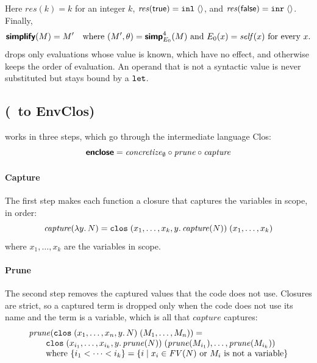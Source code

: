 Here $\mathit{res}(k) = k$ for an integer $k$,
$\mathit{res}(\mathsf{true}) = \mathtt{inl}\;\langle\rangle$, and
$\mathit{res}(\mathsf{false}) = \mathtt{inr}\;\langle\rangle$. Finally,
\[
  \textsf{\bfseries simplify}(M) = M'
  \quad \text{where } (M', \theta) = \textsf{\bfseries simp}^{4}_{E_0}(M)
  \text{ and } E_0(x) = \mathit{self}(x) \text{ for every } x.
\]
 drops only evaluations whose value is known, which
have no effect, and otherwise keeps the order of evaluation. An operand
that is not a syntactic value is never substituted but stays bound by a
$\mathtt{let}$.

\subsection{ (\fpc\ to EnvClos)}
\label{app:pass-enclose}

 works in three steps, which go through the intermediate
language Clos:
\[
  \textsf{\bfseries enclose} = \mathit{concretize}_\emptyset \circ \mathit{prune} \circ \mathit{capture}
\]

\paragraph{Capture}

The first step makes each function a closure that captures the variables in scope, in order:
\[
  \mathit{capture}(\lambda y.\, N) =
    \mathtt{clos}\;(x_1, \ldots, x_k, y.\,\mathit{capture}(N))\;(x_1, \ldots, x_k)
\]
where $x_1, \ldots, x_k$ are the variables in scope.

\paragraph{Prune}

The second step removes the captured values that the code does not use.
Closures are strict, so a captured term is dropped only when the code
does not use its name and the term is a variable, which is all that
$\mathit{capture}$ captures:
\[
\begin{array}{@{}l@{}}
  \mathit{prune}(\kw{clos}\;(x_1, \ldots, x_n, y.\,N)\;(M_1, \ldots, M_n)) =\\
  \qquad \kw{clos}\;(x_{i_1}, \ldots, x_{i_k}, y.\,\mathit{prune}(N))\;
    (\mathit{prune}(M_{i_1}), \ldots, \mathit{prune}(M_{i_k}))\\
  \qquad \text{where } \{ i_1 < \cdots < i_k \} =
    \{ i \mid x_i \in \mathit{FV}(N) \text{ or } M_i \text{ is not a variable} \}
\end{array}
\]

